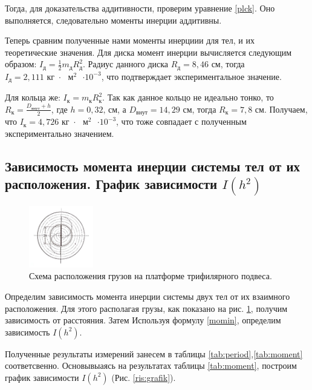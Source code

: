 \documentclass[a4paper,12pt]{article}
\begin{document}
	Тогда, для доказательства аддитивности, проверим уравнение \eqref{plck}. Оно выполняется, следовательно моменты инерции аддитивны.
	
	Теперь сравним полученные нами моменты инерциии для тел, и их теоретические значения. Для диска момент инерции вычисляется следующим образом: $I_\text{д} = \frac{1}{2}m_\text{д}R_\text{д}^2$. Радиус данного диска $R_\text{д} = 8,46 \text{ см}$, тогда $I_\text{д} = 2,111 \text{  кг $\cdot$ $\text{м}^2$ $\cdot 10^{-3}$}$, что подтверждает экспериментальное значение.
	
	Для кольца же: $I_\text{к} = m_\text{к}R_\text{к}^2$. Так как данное кольцо не идеально тонко, то $R_\text{к} = \frac{D_\text{внут} + h}{2}$, где $h = 0,32 \text{, см}$, а $D_\text{внут} = 14,29\text{ см}$, тогда $R_\text{к} = 7,8 \text{ см}$. Получаем, что $I_\text{к} = 4,726\text{  кг $\cdot$ $\text{м}^2$ $\cdot 10^{-3}$}$, что тоже совпадает с полученным экспериментально значением.
	
	\subsection{Зависимость момента инерции системы тел от их расположения. График зависимости $I(h^2)$}
	
	\begin{figure}
		\vspace{-3em}
		\includegraphics[width=0.25\textwidth]{position}
		\caption{Схема расположения грузов на платформе трифилярного подвеса.}
		\label{ris:position}
	\end{figure}
	
	Определим зависимость момента инерции системы двух тел от их взаимного расположения. Для этого располагая грузы, как показано на рис. \ref{ris:position}, получим зависимость от расстояния. Затем Используя формулу \ref{momin}, определим зависимость $I(h^2)$.
	
	Полученные результаты измерений занесем в таблицы \eqref{tab:period},\eqref{tab:moment} соответсвенно. Основывыаясь на результатах таблицы \eqref{tab:moment}, построим график зависимости $ I(h^{2}) $ (Рис. \ref{ris:grafik}).
	\bigskip\bigskip\bigskip\bigskip\bigskip
	
\end{document}
